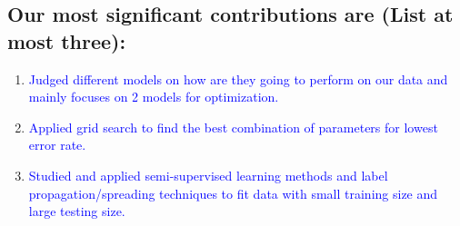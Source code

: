 \documentclass[11pt]{article}
\begin{document}
\begin{enumerate}
\subsection*{Our most significant contributions are (List at most three):}
\begin{enumerate}
\setlength\itemsep{0cm}
\item \textcolor{blue}{Judged different models on how are they going to perform on our data and mainly focuses on 2 models for optimization.} \\
\item \textcolor{blue}{Applied grid search to find the best combination of parameters for lowest error rate.} \\ 
\item \textcolor{blue}{Studied and applied semi-supervised learning methods and label propagation/spreading techniques to fit data with small training size and large testing size.}
\end{enumerate}

\end{enumerate}

\end{document}
